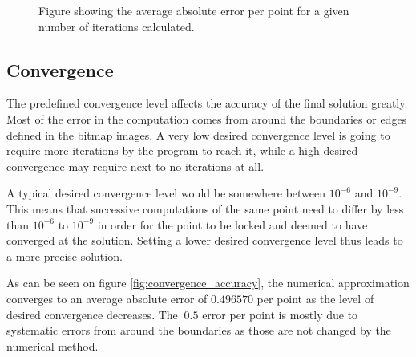 \begin{figure}[h!]
\centering
\setlength\fboxsep{0pt}
\setlength\fboxrule{0.5pt}
\label{fig:iterations_vs_accuracy}
\caption{Figure showing the average absolute error per point for a given number of iterations calculated.}
\end{figure}

\subsection{Convergence}
The predefined convergence level affects the accuracy of the final solution greatly. Most of the error in the computation comes from around the boundaries or edges defined in the bitmap images. A very low desired convergence level is going to require more iterations by the program to reach it, while a high desired convergence may require next to no iterations at all. 

A typical desired convergence level would be somewhere between $10^{-6}$ and $10^{-9}$. This means that successive computations of the same point need to differ by less than $10^{-6}$ to $10^{-9}$ in order for the point to be locked and deemed to have converged at the solution. Setting a lower desired convergence level thus leads to a more precise solution. 

As can be seen on figure \ref{fig:convergence_accuracy}, the numerical approximation converges to an average absolute error of $0.496570$ per point as the level of desired convergence decreases. The $~0.5$ error per point is mostly due to systematic errors from around the boundaries as those are not changed by the numerical method. 

